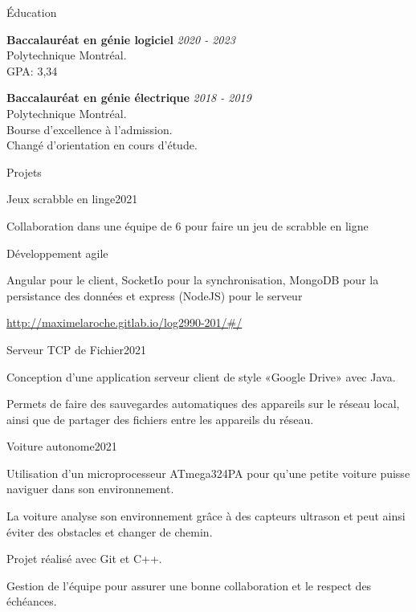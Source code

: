 \documentclass[french,12pt]{resume} %
\begin{document}
	\begin{rSection}{Éducation}
		
		{\bf Baccalauréat en génie logiciel} \hfill {\em  2020 - 2023} 
		\\ Polytechnique Montréal.
		\\GPA: 3,34 
		
		
		{\bf Baccalauréat en génie électrique} \hfill {\em  2018 - 2019} 
		\\ Polytechnique Montréal.
		\\ Bourse d'excellence à l'admission.
		\\ Changé d'orientation en cours d'étude.
		
	\end{rSection}
	
	
	\begin{rSection}{Projets}

		\begin{rSubsection}{Jeux scrabble en linge}{2021}{}{}
			\item   Collaboration dans une équipe de 6 pour faire un jeu de scrabble en ligne
			\item Développement agile
			\item Angular pour le client, SocketIo pour la synchronisation, MongoDB pour la persistance des données et express (NodeJS) pour le serveur
			\item \url{http://maximelaroche.gitlab.io/log2990-201/#/}
		\end{rSubsection}
		\begin{rSubsection}{Serveur TCP de Fichier}{2021}{}{}
			\item Conception d'une application serveur client de style «Google Drive» avec Java.
			\item Permets de faire des sauvegardes automatiques des appareils sur le réseau local, ainsi que de partager des fichiers entre les appareils du réseau.
		\end{rSubsection}
		 \begin{rSubsection}{Voiture autonome}{2021}{}{}
			\item Utilisation d'un microprocesseur ATmega324PA pour qu'une petite voiture puisse naviguer dans son environnement.
			\item La voiture analyse son environnement grâce à des capteurs ultrason et peut ainsi éviter des obstacles et changer de chemin.
			\item Projet réalisé avec Git et C++.
			\item Gestion de l'équipe pour assurer une bonne collaboration et le respect des échéances.
			 
		 \end{rSubsection}


		
	\end{rSection}
	
\end{document}
